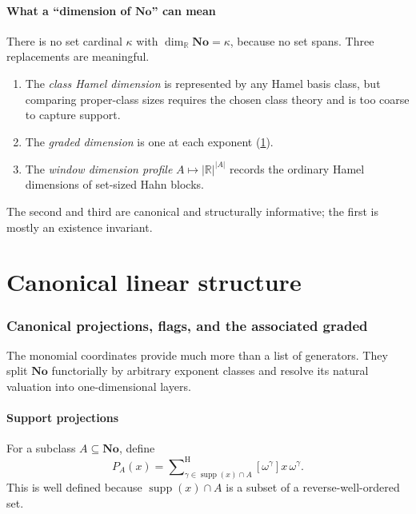 \documentclass[11pt,letterpaper]{article}
\numberwithin{equation}{section}
\theoremstyle{definition}
\theoremstyle{remark}
\newcommand{\No}{\mathbf{No}}
\newcommand{\R}{\mathbb{R}}
\newcommand{\supp}{\operatorname{supp}}
\newcommand{\sH}{\mathop{\sum}\nolimits^{\mathrm H}}
\begin{document}
\subsection{What a ``dimension of \texorpdfstring{\(\No\)}{No}'' can mean}

There is no set cardinal \(\kappa\) with \(\dim_{\R}\No=\kappa\), because no
set spans.  Three replacements are meaningful.
\begin{enumerate}
\item The \emph{class Hamel dimension} is represented by any Hamel basis
class, but comparing proper-class sizes requires the chosen class theory and
is too coarse to capture support.
\item The \emph{graded dimension} is one at each exponent
(\cref{rvs:sec:filtration}).
\item The \emph{window dimension profile}
\(A\mapsto\lvert\R\rvert^{\lvert A\rvert}\) records the ordinary Hamel
dimensions of set-sized Hahn blocks.
\end{enumerate}
The second and third are canonical and structurally informative; the first is
mostly an existence invariant.

\part{Canonical linear structure}\label{rvs:w:part:linear}

\section{Canonical projections, flags, and the associated graded}\label{rvs:sec:filtration}
\label{rvs:cv:sec:projections}\label{rvs:cv:sec:graded}

The monomial coordinates provide much more than a list of generators.  They
split \(\No\) functorially by arbitrary exponent classes and resolve its
natural valuation into one-dimensional layers.

\subsection{Support projections}\label{rvs:subsec:support-projections}

For a subclass \(A\subseteq\No\), define
\begin{equation}\label{rvs:eq:PA}
 P_A(x)=\sH_{\gamma\in\supp(x)\cap A}
       [\omega^\gamma]x\,\omega^\gamma.
\end{equation}
This is well defined because \(\supp(x)\cap A\) is a subset of a
reverse-well-ordered set.
\end{document}
